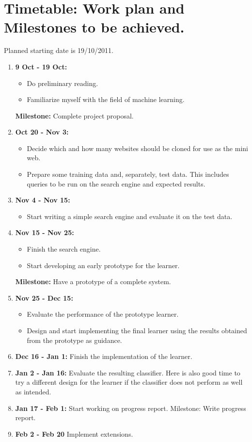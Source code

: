 \section*{\bf Timetable: Work plan and Milestones to be achieved.}


Planned starting date is 19/10/2011.

\begin{enumerate}

\item {\bf 9 Oct - 19 Oct:} 
\begin{itemize}
\item Do preliminary reading.
\item Familiarize myself with the field of machine learning.
\end{itemize} 
{\bf Milestone: } Complete project proposal. 
\item {\bf Oct 20 - Nov 3:} 
    \begin{itemize}
    \item Decide which and how many websites should be cloned for use as the mini web.  
    \item Prepare some training data and, separately, test data. This includes queries to be run on the search engine and expected results. 
    \end{itemize}
\item {\bf Nov 4 - Nov 15:} 
    \begin{itemize}
    \item Start writing a simple search engine and evaluate it on the test data. 
    \end{itemize}
\item {\bf Nov 15 - Nov 25:} 
    \begin{itemize}
    \item Finish the search engine.
    \item Start developing an early prototype for the learner. 
    \end{itemize} 
    {\bf Milestone: } Have a prototype of a complete system.
\item {\bf Nov 25 - Dec 15:} 
\begin{itemize}
\item Evaluate the performance of the prototype learner. 
\item Design and start implementing the final learner using the results obtained from the prototype as guidance. 
\end{itemize}
\item {\bf Dec 16 - Jan 1:} Finish the implementation of the learner. 
\item {\bf Jan 2 - Jan 16:} 
     Evaluate the resulting classifier. Here is also good time to try a different design for the learner if the classifier does not perform as well as intended.
\item {\bf Jan 17 - Feb 1:} Start working on progress report.  
{Milestone: } Write progress report. 
\item {\bf Feb 2 - Feb 20} Implement extensions.


\end{enumerate}

